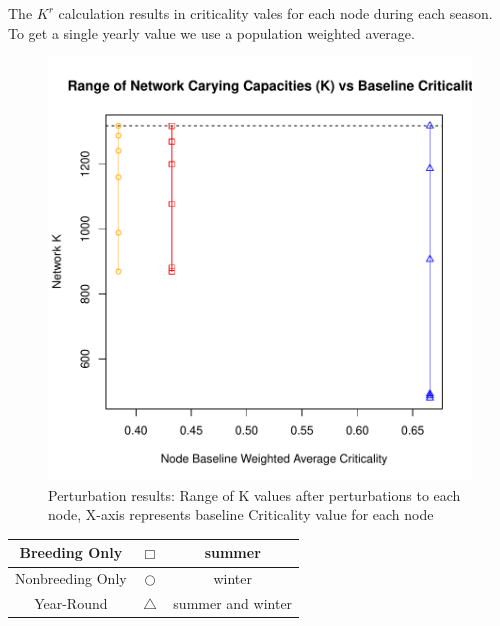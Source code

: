\documentclass[10pt]{article}
\begin{document}
The $K^r$ calculation results in criticality vales for each node during each season. To get a single yearly value we use a population weighted average.



\vspace{-.5cm}
\begin{figure}[H]
\begin{center}
\includegraphics[width=.8\textwidth, height=.8\textwidth]{RGraphics-elk_barcr_KR}
\caption{Perturbation results: Range of K values after perturbations to each node, X-axis represents baseline Criticality value for each node}\label{fig:elk_barcr_KR}
\end{center}
\end{figure}

\vspace{-.5cm}
\begin{tabular}{|c|c|c|}
\hline
{\color{red} Breeding Only} & $\Box$ & summer \\
\hline
{\color{orange} Nonbreeding Only} & $\bigcirc$ & winter \\
\hline
{\color{blue} Year-Round} & $\triangle$ &  summer and winter \\
\hline
\end{tabular}
\end{document}
